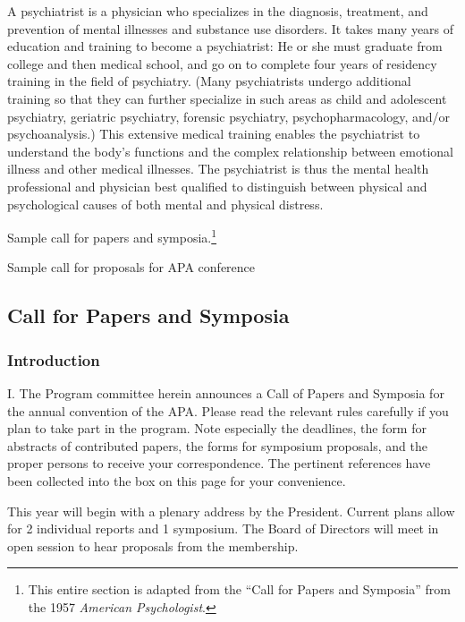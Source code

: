 \begin{refsection}
A psychiatrist is a physician who specializes in the diagnosis, treatment, and prevention of mental illnesses and substance use disorders. It takes many years of education and training to become a psychiatrist: He or she must graduate from college and then medical school, and go on to complete four years of residency training in the field of psychiatry. (Many psychiatrists undergo additional training so that they can further specialize in such areas as child and adolescent psychiatry, geriatric psychiatry, forensic psychiatry, psychopharmacology, and\slash or psychoanalysis.) This extensive medical training enables the psychiatrist to understand the body's functions and the complex relationship between emotional illness and other medical illnesses. The psychiatrist is thus the mental health professional and physician best qualified to distinguish between physical and psychological causes of both mental and physical distress.

Sample call for papers and symposia.\footnote{This entire section is adapted from the ``Call for Papers and Symposia'' from the 1957 \emph{American Psychologist}.}


\begin{apatextbox}{Sample call for proposals for APA conference}  

\subsection{Call for Papers and Symposia}
\label{callforpapersandsymposia}

\subsubsection{Introduction}
\label{introduction}

I. The Program committee herein announces a Call of Papers and Symposia for the annual convention of the APA. Please read the relevant rules carefully if you plan to take part in the program. Note especially the deadlines, the form for abstracts of contributed papers, the forms for symposium proposals, and the proper persons to receive your correspondence. The pertinent references have been collected into the box on this page for your convenience.

This year will begin with a plenary address by the President. Current plans allow for 2 individual reports and 1 symposium. The Board of Directors will meet in open session to hear proposals from the membership.


\end{apatextbox}
\end{refsection}
